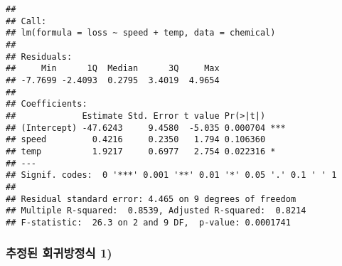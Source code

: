 \documentclass[
]{article}
\newenvironment{Shaded}{\begin{snugshade}}{\end{snugshade}}
\newcommand{\CommentTok}[1]{\textcolor[rgb]{0.56,0.35,0.01}{\textit{#1}}}
\newcommand{\ControlFlowTok}[1]{\textcolor[rgb]{0.13,0.29,0.53}{\textbf{#1}}}
\newcommand{\DecValTok}[1]{\textcolor[rgb]{0.00,0.00,0.81}{#1}}
\newcommand{\FunctionTok}[1]{\textcolor[rgb]{0.00,0.00,0.00}{#1}}
\newcommand{\NormalTok}[1]{#1}
\newcommand{\OtherTok}[1]{\textcolor[rgb]{0.56,0.35,0.01}{#1}}
\newcommand{\SpecialCharTok}[1]{\textcolor[rgb]{0.00,0.00,0.00}{#1}}
\newcommand{\StringTok}[1]{\textcolor[rgb]{0.31,0.60,0.02}{#1}}
\begin{document}
\begin{verbatim}
## 
## Call:
## lm(formula = loss ~ speed + temp, data = chemical)
## 
## Residuals:
##     Min      1Q  Median      3Q     Max 
## -7.7699 -2.4093  0.2795  3.4019  4.9654 
## 
## Coefficients:
##             Estimate Std. Error t value Pr(>|t|)    
## (Intercept) -47.6243     9.4580  -5.035 0.000704 ***
## speed         0.4216     0.2350   1.794 0.106360    
## temp          1.9217     0.6977   2.754 0.022316 *  
## ---
## Signif. codes:  0 '***' 0.001 '**' 0.01 '*' 0.05 '.' 0.1 ' ' 1
## 
## Residual standard error: 4.465 on 9 degrees of freedom
## Multiple R-squared:  0.8539, Adjusted R-squared:  0.8214 
## F-statistic:  26.3 on 2 and 9 DF,  p-value: 0.0001741
\end{verbatim}

\hypertarget{uxcd94uxc815uxb41c-uxd68cuxadc0uxbc29uxc815uxc2dd-1}{%
\subsubsection{추정된 회귀방정식
1)}\label{uxcd94uxc815uxb41c-uxd68cuxadc0uxbc29uxc815uxc2dd-1}}

\begin{Shaded}
\end{Shaded}
\end{document}
